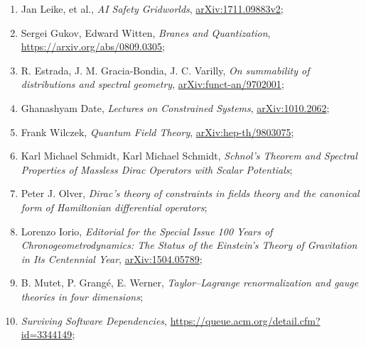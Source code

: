 \documentclass[a4paper,11pt]{article}
\begin{document}
\begin{enumerate}
\item Jan Leike, et al., \textit{AI Safety Gridworlds},
  \href{https://arxiv.org/abs/1711.09883}{arXiv:1711.09883v2};



\item Sergei Gukov, Edward Witten, \textit{Branes and Quantization},
  \href{https://arxiv.org/abs/0809.0305}{https://arxiv.org/abs/0809.0305};



\item R. Estrada, J. M. Gracia-Bondia, J. C. Varilly, \textit{On
    summability of distributions and spectral geometry},
  \href{https://arxiv.org/abs/funct-an/9702001v1}{arXiv:funct-an/9702001};



\item Ghanashyam Date, \textit{Lectures on Constrained Systems},
  \href{https://arxiv.org/abs/1010.2062v1}{arXiv:1010.2062};



\item Frank Wilczek, \textit{Quantum Field Theory},
  \href{https://arxiv.org/abs/hep-th/9803075v2}{arXiv:hep-th/9803075};



\item Karl Michael Schmidt, Karl Michael Schmidt, \textit{Schnol’s
    Theorem and Spectral Properties of Massless Dirac Operators with
    Scalar Potentials};



\item Peter J. Olver, \textit{Dirac’s theory of constraints in fields
    theory and the canonical form of Hamiltonian differential
    operators};



\item Lorenzo Iorio, \textit{Editorial for the Special Issue 100 Years
    of Chronogeometrodynamics: The Status of the Einstein's Theory of
    Gravitation in Its Centennial Year},
  \href{https://arxiv.org/abs/1504.05789v2}{arXiv:1504.05789};



\item B. Mutet, P. Grang\'{e}, E. Werner, \textit{Taylor–Lagrange
    renormalization and gauge theories in four dimensions};



\item \textit{Surviving Software Dependencies},
  \href{https://queue.acm.org/detail.cfm?id=3344149}{https://queue.acm.org/detail.cfm?id=3344149};




\end{enumerate}
\end{document}
